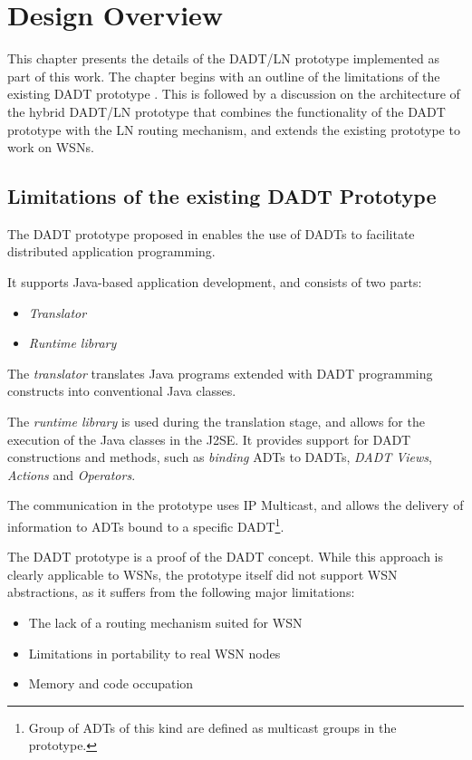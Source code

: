 \chapter{Design Overview}\label{chap:design}

This chapter presents the details of the DADT/LN prototype implemented as part of
this work. The chapter begins with an outline of the limitations of the
existing DADT prototype \cite{migliavacca_DADT:2006}. This is followed by a
discussion on the architecture of the hybrid DADT/LN prototype that combines
the functionality of the DADT prototype with the LN routing mechanism, and
extends the existing prototype to work on WSNs.

\section{Limitations of the existing DADT Prototype}

The DADT prototype proposed in \cite{migliavacca_DADT:2006} enables the use of
DADTs to facilitate distributed application programming.

It supports Java-based application development, and consists of two parts:
\begin{itemize}
  \item \emph{Translator}
  \item \emph{Runtime library} 
\end{itemize}

The \emph{translator} translates Java programs
  extended with DADT programming constructs into conventional Java classes.

The \emph{runtime library} is used during the translation stage, and allows for
the execution of the Java classes in the J2SE. It provides support for DADT
constructions and methods, such as \emph{binding} ADTs to DADTs, \emph{DADT Views}, \emph{Actions} and
\emph{Operators}.

The communication in the prototype uses IP Multicast, and
allows the delivery of information to ADTs bound to a specific DADT\footnote{Group of ADTs of this kind are defined as
multicast groups in the prototype.}.

The DADT prototype is a proof of the DADT concept. While this
approach is clearly applicable to WSNs, the prototype itself did not support WSN
abstractions, as it suffers from the following major limitations:

\begin{itemize}
  \item The lack of a routing mechanism suited for WSN
  \item Limitations in portability to real WSN nodes
  \item Memory and code occupation
\end{itemize}

